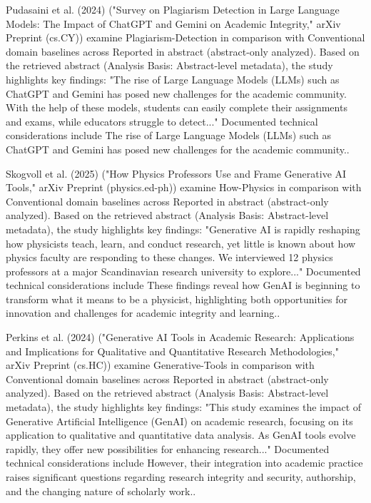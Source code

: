\documentclass[10pt,twocolumn,letterpaper]{article}
\begin{document}
Pudasaini et al. (2024) \cite{ref12} ("Survey on Plagiarism Detection in Large Language Models: The Impact of ChatGPT and Gemini on Academic Integrity," arXiv Preprint (cs.CY)) examine Plagiarism-Detection in comparison with Conventional domain baselines across Reported in abstract (abstract-only analyzed). Based on the retrieved abstract (Analysis Basis: Abstract-level metadata), the study highlights key findings: "The rise of Large Language Models (LLMs) such as ChatGPT and Gemini has posed new challenges for the academic community. With the help of these models, students can easily complete their assignments and exams, while educators struggle to detect..." Documented technical considerations include The rise of Large Language Models (LLMs) such as ChatGPT and Gemini has posed new challenges for the academic community..

Skogvoll et al. (2025) \cite{ref14} ("How Physics Professors Use and Frame Generative AI Tools," arXiv Preprint (physics.ed-ph)) examine How-Physics in comparison with Conventional domain baselines across Reported in abstract (abstract-only analyzed). Based on the retrieved abstract (Analysis Basis: Abstract-level metadata), the study highlights key findings: "Generative AI is rapidly reshaping how physicists teach, learn, and conduct research, yet little is known about how physics faculty are responding to these changes. We interviewed 12 physics professors at a major Scandinavian research university to explore..." Documented technical considerations include These findings reveal how GenAI is beginning to transform what it means to be a physicist, highlighting both opportunities for innovation and challenges for academic integrity and learning..

Perkins et al. (2024) \cite{ref15} ("Generative AI Tools in Academic Research: Applications and Implications for Qualitative and Quantitative Research Methodologies," arXiv Preprint (cs.HC)) examine Generative-Tools in comparison with Conventional domain baselines across Reported in abstract (abstract-only analyzed). Based on the retrieved abstract (Analysis Basis: Abstract-level metadata), the study highlights key findings: "This study examines the impact of Generative Artificial Intelligence (GenAI) on academic research, focusing on its application to qualitative and quantitative data analysis. As GenAI tools evolve rapidly, they offer new possibilities for enhancing research..." Documented technical considerations include However, their integration into academic practice raises significant questions regarding research integrity and security, authorship, and the changing nature of scholarly work..
\end{document}
